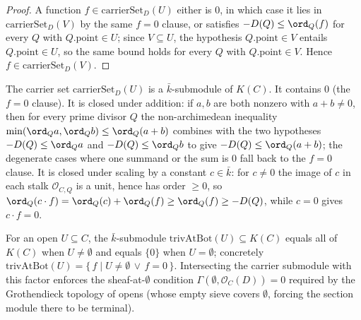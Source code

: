 \begin{proof}
  A function \(f \in \mathrm{carrierSet}_D(U)\) either is \(0\), in which
  case it lies in \(\mathrm{carrierSet}_D(V)\) by the same \(f = 0\) clause,
  or satisfies \(-D(Q) \le \ord_Q(f)\) for every \(Q\) with
  \(Q.\mathrm{point} \in U\); since \(V \subseteq U\), the hypothesis
  \(Q.\mathrm{point} \in V\) entails \(Q.\mathrm{point} \in U\), so the same
  bound holds for every \(Q\) with \(Q.\mathrm{point} \in V\). Hence
  \(f \in \mathrm{carrierSet}_D(V)\).
\end{proof}

\begin{definition}

  \label{def:sheafOf_carrierSubmodule}
  The carrier set \(\mathrm{carrierSet}_D(U)\) is a \(\bar k\)-submodule of
  \(K(C)\). It contains \(0\) (the \(f = 0\) clause). It is closed under
  addition: if \(a, b\) are both nonzero with \(a + b \neq 0\), then for
  every prime divisor \(Q\) the non-archimedean inequality
  \(\min(\ord_Q a, \ord_Q b) \le \ord_Q(a + b)\) combines with the two hypotheses
  \(-D(Q) \le \ord_Q a\) and \(-D(Q) \le \ord_Q b\) to give
  \(-D(Q) \le \ord_Q(a + b)\); the degenerate cases where one summand or the
  sum is \(0\) fall back to the \(f = 0\) clause. It is closed under scaling
  by a constant \(c \in \bar k\): for \(c \neq 0\) the image of \(c\) in
  each stalk \(\mathcal O_{C, Q}\) is a unit, hence has order \(\ge 0\), so
  \(\ord_Q(c \cdot f) = \ord_Q(c) + \ord_Q(f) \ge \ord_Q(f) \ge -D(Q)\),
  while \(c = 0\) gives \(c \cdot f = 0\).
\end{definition}

\begin{definition}

  \label{def:sheafOf_trivAtBot}
  For an open \(U \subseteq C\), the \(\bar k\)-submodule
  \(\mathrm{trivAtBot}(U) \subseteq K(C)\) equals all of \(K(C)\) when
  \(U \ne \emptyset\) and equals \(\{0\}\) when \(U = \emptyset\); concretely
  \(\mathrm{trivAtBot}(U) = \{\, f \mid U \ne \emptyset \,\lor\, f = 0\,\}\).
  Intersecting the carrier submodule with this factor enforces the
  sheaf-at-\(\emptyset\) condition \(\Gamma(\emptyset, \mathcal O_C(D)) = 0\)
  required by the Grothendieck topology of opens (whose empty sieve covers
  \(\emptyset\), forcing the section module there to be terminal).
\end{definition}

